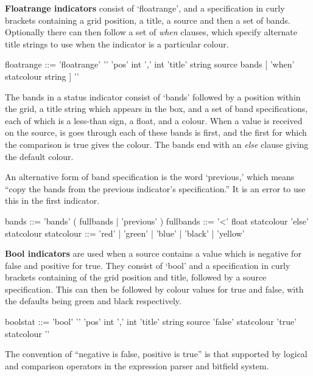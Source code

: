 \textbf{Floatrange indicators} consist of `floatrange', and a specification
in curly brackets containing a grid position, a title, a source
and then a set of bands. Optionally there can then follow a set
of \emph{when} clauses, which specify alternate title strings
to use when the indicator is a particular colour.
\begin{v}
floatrange  ::= 'floatrange' '{' 
                    'pos' int ',' int
                    'title' string
                    source
                    bands
                    [{ 'when' statcolour string }]
                '}'
\end{v}
The bands in a status indicator consist of `bands' followed by a position
within the grid, a title string which appears in the box, and
a set of band specifications, each of which is a less-than sign,
a float, and a colour. When a value is received on the source,
is goes through each of these bands is first, and the first for
which the comparison is true gives the colour. The bands end
with an \emph{else} clause giving the default colour.

An alternative form of band specification is the word `previous,'
which means ``copy the bands from the previous indicator's
specification.'' It is an error to use this in the first indicator.
\begin{v}
bands       ::= 'bands' ( fullbands | 'previous' )
fullbands   ::= { '<' float statcolour }
                'else' statcolour
statcolour  ::= 'red' | 'green' | 'blue' | 'black' | 'yellow'
\end{v}

\textbf{Bool indicators} are used when a source contains a value which is negative for false
and positive for true. They consist of
`bool' and a specification in curly brackets
containing of the grid position and title, followed by a source specification.
This can then be followed by colour values for true and false, with the defaults
being green and black respectively.
\begin{v}
boolstat    ::= 'bool' '{' 
                    'pos' int ',' int
                    'title' string
                    source
                    { 'false' statcolour }
                    { 'true' statcolour }
                 '}'
\end{v}
The convention of ``negative is false, positive is true'' is that supported by logical
and comparison operators in the expression parser and bitfield system.


